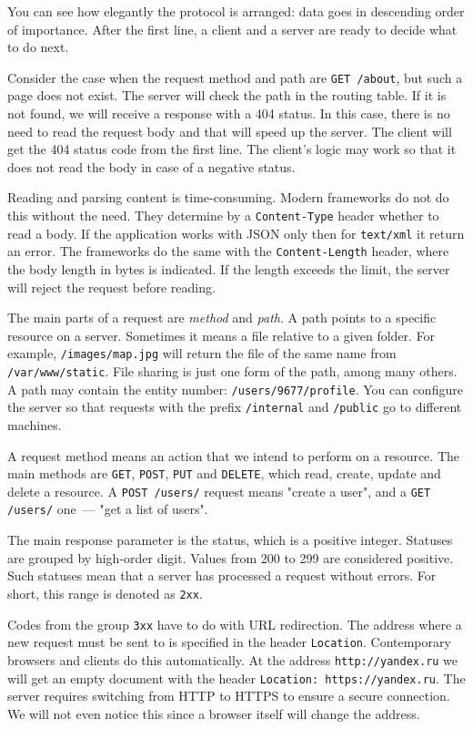 You can see how elegantly the protocol is arranged: data goes in descending order of importance. After the first line, a client and a server are ready to decide what to do next.


Consider the case when the request method and path are \verb|GET /about|, but such a page does not exist. The server will check the path in the routing table. If it is not found, we will receive a response with a 404 status. In this case, there is no need to read the request body and that will speed up the server. The client will get the 404 status code from the first line. The client's logic may work so that it does not read the body in case of a negative status.

Reading and parsing content is time-consuming. Modern frameworks do not do this without the need. They determine by a \verb|Content-Type| header whether to read a body. If the application works with JSON only then for \verb|text/xml| it return an error. The frameworks do the same with the \verb|Content-Length| header, where the body length in bytes is indicated. If the length exceeds the limit, the server will reject the request before reading.

The main parts of a request are \emph{method} and \emph{path}. A path points to a specific resource on a server. Sometimes it means a file relative to a given folder. For example, \verb|/images/map.jpg| will return the file of the same name from \verb|/var/www/static|. File sharing is just one form of the path, among many others. A path may contain the entity number: \verb|/users/9677/profile|. You can configure the server so that requests with the prefix \verb|/internal| and \verb|/public| go to different machines.

A request method means an action that we intend to perform on a resource. The main methods are \verb|GET|, \verb|POST|, \verb|PUT| and \verb|DELETE|, which read, create, update and delete a resource. A \verb|POST /users/| request  means "create a user", and a \verb|GET /users/| one~--- "get a list of users".

The main response parameter is the status, which is a positive integer. Statuses are grouped by high-order digit. Values from 200 to 299 are considered positive. Such statuses mean that a server has processed a request without errors. For short, this range is denoted as \verb|2хх|.

Codes from the group \verb|3хх| have to do with URL redirection. The address where a new request must be sent to is specified in the header \verb|Location|. Contemporary browsers and clients do this automatically. At the address \verb|http://yandex.ru| we will get an empty document with the header \verb|Location: https://yandex.ru|. The server requires switching from HTTP to HTTPS to ensure a secure connection. We will not even notice this since a browser itself will change the address.

